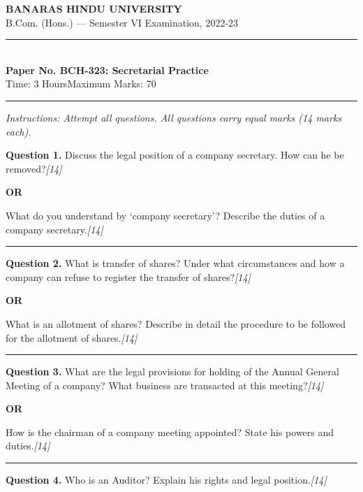 \documentclass[11pt,a4paper]{article}
\newcommand{\pts}[1]{\hfill   \textit{[#1]}}
\begin{document}
\begin{center}
  {\large\bfseries BANARAS HINDU UNIVERSITY}\\[2pt]
  {\normalsize B.Com. (Hons.) --- Semester VI Examination, 2022-23}\\[6pt]
  \rule{0.8\linewidth}{0.5pt}\\[6pt]
  {\large\bfseries Paper No. BCH-323: Secretarial Practice}\\[4pt]
  {\normalsize Time: 3 Hours\hfill Maximum Marks: 70}
\end{center}

\rule{\linewidth}{0.4pt}

\smallskip



\noindent   \textit{Instructions: Attempt all questions. All questions carry equal marks (14 marks each).}

\bigskip




\noindent   \textbf{Question 1.}
Discuss the legal position of a company secretary. How can he be removed?\pts{14}

\centerline{   \textbf{OR}}

What do you understand by `company secretary'? Describe the duties of a company secretary.\pts{14}

\medskip\rule{\linewidth}{0.2pt}




\noindent   \textbf{Question 2.}
What is transfer of shares? Under what circumstances and how a company can refuse to register the transfer of shares?\pts{14}

\centerline{   \textbf{OR}}

What is an allotment of shares? Describe in detail the procedure to be followed for the allotment of shares.\pts{14}

\medskip\rule{\linewidth}{0.2pt}




\noindent   \textbf{Question 3.}
What are the legal provisions for holding of the Annual General Meeting of a company? What business are transacted at this meeting?\pts{14}

\centerline{   \textbf{OR}}

How is the chairman of a company meeting appointed? State his powers and duties.\pts{14}

\medskip\rule{\linewidth}{0.2pt}




\noindent   \textbf{Question 4.}
Who is an Auditor? Explain his rights and legal position.\pts{14}
\end{document}
